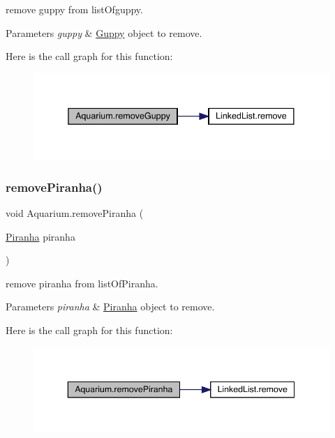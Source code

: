 remove guppy from list\+Ofguppy. 
\begin{DoxyParams}{Parameters}
{\em guppy} & \mbox{\hyperlink{class_guppy}{Guppy}} object to remove. \\
\hline
\end{DoxyParams}
Here is the call graph for this function\+:
\nopagebreak
\begin{figure}[H]
\begin{center}
\leavevmode
\includegraphics[width=338pt]{class_aquarium_a08f7e597644cad58198ed84d431f4599_cgraph}
\end{center}
\end{figure}
\mbox{\label{class_aquarium_ae0e31a6266a7d847f2bcaf1ee77fe5b4}} 
\subsubsection{\texorpdfstring{remove\+Piranha()}{removePiranha()}}
{\footnotesize\ttfamily void Aquarium.\+remove\+Piranha (\begin{DoxyParamCaption}\item[{\mbox{\hyperlink{class_piranha}{Piranha}}}]{piranha }\end{DoxyParamCaption})\hspace{0.3cm}{\ttfamily [inline]}}

remove piranha from list\+Of\+Piranha. 
\begin{DoxyParams}{Parameters}
{\em piranha} & \mbox{\hyperlink{class_piranha}{Piranha}} object to remove. \\
\hline
\end{DoxyParams}
Here is the call graph for this function\+:
\nopagebreak
\begin{figure}[H]
\begin{center}
\leavevmode
\includegraphics[width=343pt]{class_aquarium_ae0e31a6266a7d847f2bcaf1ee77fe5b4_cgraph}
\end{center}
\end{figure}


